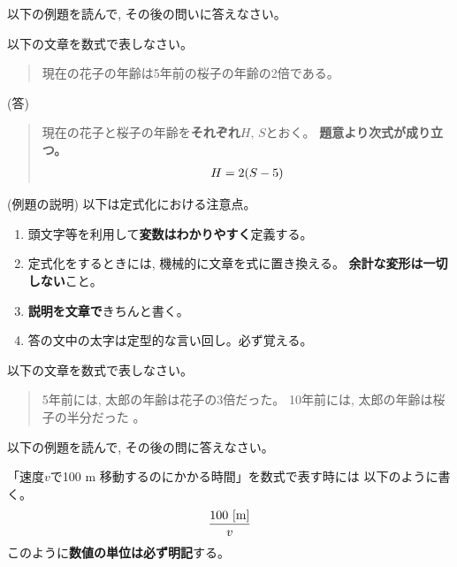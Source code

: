 \documentclass[twocolumn,11pt]{jarticle}
\begin{document}
\nquestion
以下の例題を読んで, その後の問いに答えなさい。

\noindent
[例題]
以下の文章を数式で表しなさい。
\begin{quote}
  現在の花子の年齢は5年前の桜子の年齢の2倍である。
\end{quote}
\noindent
(答)
\begin{quote}
  現在の花子と桜子の年齢を\textbf{それぞれ}$H$, $S$とおく。
  \textbf{題意より次式が成り立つ。}
  \begin{align}
    H=2(S-5)\notag
  \end{align}
\end{quote}
\noindent
(例題の説明)
以下は定式化における注意点。
\begin{enumerate}
\item 頭文字等を利用して\textbf{変数はわかりやすく}定義する。
\item 定式化をするときには, 機械的に文章を式に置き換える。
  \textbf{余計な変形は一切しない}こと。
\item \textbf{説明を文章で}きちんと書く。
\item 答の文中の太字は定型的な言い回し。必ず覚える。
\end{enumerate}

\noindent
[問]
以下の文章を数式で表しなさい。
\begin{quote}
  5年前には, 太郎の年齢は花子の3倍だった。
  10年前には, 太郎の年齢は桜子の半分だった
。
\end{quote}

\nquestion
以下の例題を読んで, その後の問に答えなさい。

「速度$v$で100 m 移動するのにかかる時間」を数式で表す時には
以下のように書く。
\begin{align}
\frac{100 \mbox{~[m]}}{v}\notag
\end{align}
このように\textbf{数値の単位は必ず明記}する。
\end{document}
